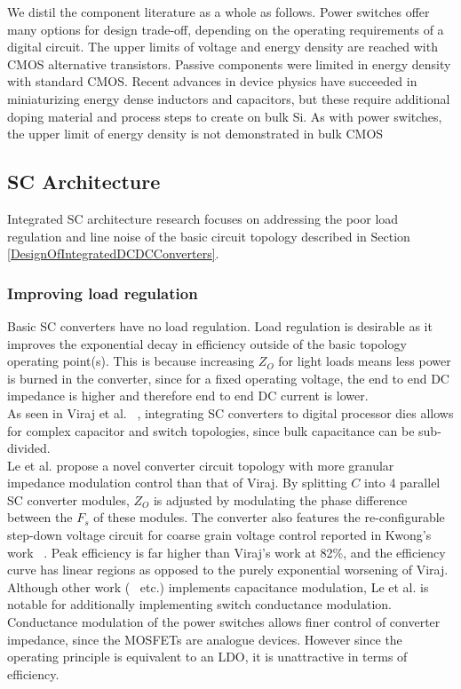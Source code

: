 \documentclass[letterpaper,twocolumn,10pt]{article}
\begin{document}
\indent We distil the component literature as a whole as follows. Power switches offer many options for design trade-off, depending on the operating requirements of a digital circuit. The upper limits of voltage and energy density are reached with CMOS alternative transistors. Passive components were limited in energy density with standard CMOS. Recent advances in device physics have succeeded in miniaturizing energy dense inductors and capacitors, but these require additional doping material and process steps to create on bulk Si. As with power switches, the upper limit of energy density is not demonstrated in bulk CMOS\\

\subsection{SC Architecture} \label{SCArchitectureResearch}
Integrated SC architecture research focuses on addressing the poor load regulation and line noise of the basic circuit topology described in Section \ref{DesignOfIntegratedDCDCConverters}.\\
\subsubsection{Improving load regulation }
Basic SC converters have no load regulation. Load regulation is desirable as it improves the exponential decay in efficiency outside of the basic topology operating point(s). This is because increasing $Z_O$ for light loads means less power is burned in the converter, since for a fixed operating voltage, the end to end DC impedance is higher and therefore end to end DC current is lower.\\
\indent As seen in  Viraj et al. ~\cite{Viraj2007}, integrating SC converters to digital processor dies allows for complex capacitor and switch topologies, since bulk capacitance can be sub-divided.\\
Le et al. \cite{Phuck2010} propose a novel converter circuit topology with more granular impedance modulation control than that of Viraj. By splitting $C$ into 4 parallel SC converter modules, $Z_O$ is adjusted by modulating the phase difference between the $F_s$ of these modules. The converter also features the re-configurable step-down voltage circuit for coarse grain voltage control reported in Kwong's work ~\cite{Kwong2009}. Peak efficiency is far higher than Viraj's work\cite{Viraj2007} at 82\%, and the efficiency curve has linear regions as opposed to the purely exponential worsening of Viraj.\\
Although other work (~\cite{Ramadass2010} etc.) implements capacitance modulation, Le et al. is notable for additionally implementing switch conductance modulation.\\
Conductance modulation of the power switches allows finer control of converter impedance, since the MOSFETs are analogue devices. However since the operating principle is equivalent to an LDO, it is unattractive in terms of efficiency.\\ 
\end{document}
